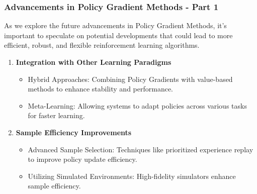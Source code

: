 \documentclass[aspectratio=169]{beamer}
\begin{document}
\begin{frame}[fragile]
    \frametitle{Advancements in Policy Gradient Methods - Part 1}
    As we explore the future advancements in Policy Gradient Methods, it’s important to speculate on potential developments that could lead to more efficient, robust, and flexible reinforcement learning algorithms.
    
    \begin{enumerate}
        \item \textbf{Integration with Other Learning Paradigms}
        \begin{itemize}
            \item Hybrid Approaches: Combining Policy Gradients with value-based methods to enhance stability and performance.
            \item Meta-Learning: Allowing systems to adapt policies across various tasks for faster learning.
        \end{itemize}
        
        \item \textbf{Sample Efficiency Improvements}
        \begin{itemize}
            \item Advanced Sample Selection: Techniques like prioritized experience replay to improve policy update efficiency.
            \item Utilizing Simulated Environments: High-fidelity simulators enhance sample efficiency.
        \end{itemize}
    \end{enumerate}
\end{frame}
\end{document}

